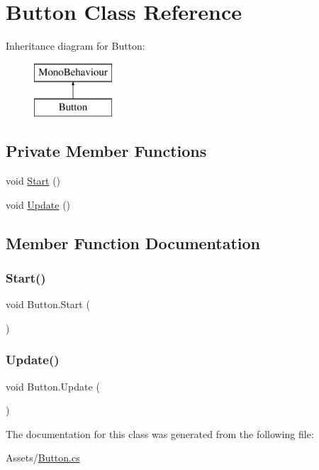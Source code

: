 \hypertarget{class_button}{}\section{Button Class Reference}
\label{class_button}
Inheritance diagram for Button\+:\begin{figure}[H]
\begin{center}
\leavevmode
\includegraphics[height=2.000000cm]{class_button}
\end{center}
\end{figure}
\subsection*{Private Member Functions}
\begin{DoxyCompactItemize}
\item 
void \hyperlink{class_button_a1ca1f623a8d5f7e9453eee7698e216ec}{Start} ()
\item 
void \hyperlink{class_button_abde2585e345c77634cc81b2f46c24936}{Update} ()
\end{DoxyCompactItemize}


\subsection{Member Function Documentation}
\mbox{\label{class_button_a1ca1f623a8d5f7e9453eee7698e216ec}} 
\subsubsection{\texorpdfstring{Start()}{Start()}}
{\footnotesize\ttfamily void Button.\+Start (\begin{DoxyParamCaption}{ }\end{DoxyParamCaption})\hspace{0.3cm}{\ttfamily [private]}}

\mbox{\label{class_button_abde2585e345c77634cc81b2f46c24936}} 
\subsubsection{\texorpdfstring{Update()}{Update()}}
{\footnotesize\ttfamily void Button.\+Update (\begin{DoxyParamCaption}{ }\end{DoxyParamCaption})\hspace{0.3cm}{\ttfamily [private]}}



The documentation for this class was generated from the following file\+:\begin{DoxyCompactItemize}
\item 
Assets/\hyperlink{_button_8cs}{Button.\+cs}\end{DoxyCompactItemize}
